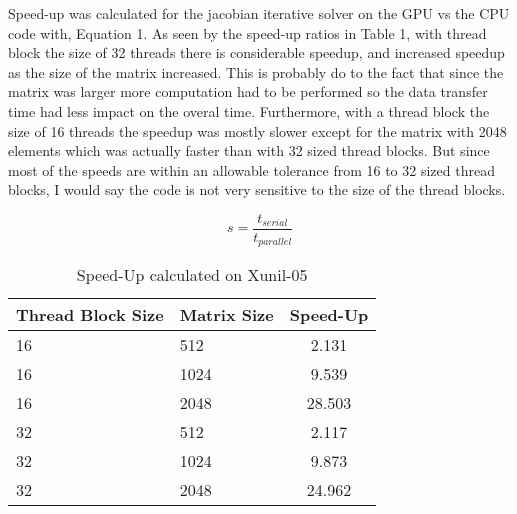 \documentclass[12pt]{article}
\begin{document}
\qquad Speed-up was calculated for the jacobian iterative solver on the GPU
vs the CPU code with, Equation 1. 
As seen by the speed-up ratios in Table 1, with thread block the size of 32 threads there is
considerable speedup, and increased speedup as the size of the matrix
increased. This is probably do to the fact that since the matrix was larger
more computation had to be performed so the data transfer time had less impact on
the overal time. Furthermore, with a thread block the size of 16 threads the
speedup was mostly slower except for the matrix with 2048 elements which was
actually faster than with 32 sized thread blocks. But since most of the
speeds are within an allowable tolerance from 16 to 32 sized thread blocks,
I would say the code is not very sensitive to the size of the thread blocks. 

\begin{equation}
    s = \frac{t_{serial}}{t_{parallel}}\label{eq1}
\end{equation}

\begin{table}[H]
\centering
\begin{tabular}{@{}|l|l|c|}
\hline
Thread Block Size & Matrix Size & Speed-Up \\ \hline
16 & 512 & 2.131  \\ \hline
16 & 1024 &  9.539 \\ \hline
16 & 2048 &  28.503 \\ \hline
32 & 512 & 2.117  \\ \hline
32 & 1024 & 9.873  \\ \hline
32 & 2048 & 24.962  \\ \hline
\end{tabular}
\caption{Speed-Up calculated on Xunil-05}
\end{table}
\end{document}
